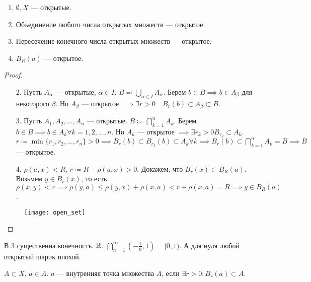 \begin{theorem}
    \begin{enumerate}
        \item $\emptyset, X$ --- открытые.
        \item Объединение любого числа открытых множеств --- открытое.
        \item Пересечение конечного числа открытых множеств --- открытое.
        \item $B_R(a)$ --- открытое.
    \end{enumerate}
\end{theorem}
\begin{proof}
    \begin{enumerate}
        \item[2.] Пусть $A_{\alpha}$ --- открытые,  $\alpha \in I$.  $B \eqqcolon \bigcup\limits_{\alpha \in I}A_{\alpha}$. Берем  $b \in B \implies b \in A_\beta$ для некоторого  $\beta$. Но  $A_\beta$ --- открытое  $\implies \exists r > 0\quad B_r(b) \subset A_\beta \subset B$.
        \item[3.] Пусть $A_1, A_2, \ldots, A_n$ --- открытые. $B \coloneqq \bigcap\limits_{k=1}^n A_k$. Берем  $b \in B \implies b \in A_k \forall k=1,2,\ldots,n$. Но $A_k$ --- открытое  $\implies \exists r_k > 0 B_{r_k} \subset A_k$. $r \coloneqq \min\{r_1, r_2, ..., r_n\} > 0 \implies B_r(b) \subset B_{r_k}(b) \subset A_k \forall k \implies B_r(b) \subset \bigcap\limits_{k=1}^n A_k = B \implies B$ --- открытое.

         \item[4.] $\rho(a, x) < R$,  $r \coloneqq R - \rho(a, x) > 0$. Докажем, что  $B_r(x) \subset B_R(a)$. Возьмем  $y \in B_r(x)$, то есть  $\rho(x, y) < r \implies \rho(y, a) \le \rho(y, x) + \rho(x, a) < r + \rho(x, a) = R \implies y \in B_R(a)$.
    \end{enumerate}
             \begin{figure}[h!]
                \texttt{[image: open\_set]}
             \end{figure}
\end{proof}
\begin{remark}
    В 3 существенна конечность. $\mathbb{R}$.  $\bigcap\limits_{n=1}^{\infty}(-\frac{1}{n}, 1) = [0, 1)$. А для нуля любой открытый шарик плохой.
\end{remark}
\begin{definition}
    $A \subset X$,  $a \in A$.  $a$ --- внутренняя точка множества  $A$, если $\exists r > 0\!: B_r(a) \subset A$.
\end{definition}
